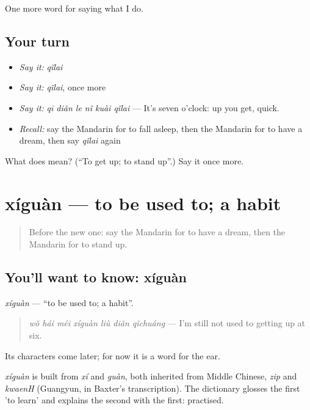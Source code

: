 \begin{grammarlens}[title={What you've built}]
One more word for saying what I do.
\end{grammarlens}

\subsection*{Your turn}
\begin{itemize}
\raggedright
  \item \emph{Say it:} \emph{qǐlai}
  \item \emph{Say it:} \emph{qǐlai}, once more
  \item \emph{Say it:} \emph{qī diǎn le nǐ kuài qǐlai} — It's seven o'clock: up you get, quick.
  \item \emph{Recall:} say the Mandarin for to fall asleep, then the Mandarin for to have a dream, then say \emph{qǐlai} again
\end{itemize}

\begin{tcolorbox}[breakable,colback=teal!4,colframe=teal!35!black,title={Before you move on}]
What does  mean? (\textquotedblleft{}To get up; to stand up\textquotedblright{}.) Say it once more.
\end{tcolorbox}
\section[xíguàn]{xíguàn — to be used to; a habit}

\label{lesson:ZH-C158-xiguan}



\begin{quote}
Before the new one: say the Mandarin for to have a dream, then the Mandarin for to stand up.
\end{quote}

\subsection*{You'll want to know: xíguàn}
\emph{xíguàn} — \textquotedblleft{}to be used to; a habit\textquotedblright{}.

\begin{quote}
\emph{wǒ hái méi xíguàn liù diǎn qǐchuáng} — I'm still not used to getting up at six.
\end{quote}

Its characters come later; for now it is a word for the ear.

\begin{cousinweb}
\emph{xíguàn} is built from \emph{xí} and \emph{guàn}, both inherited from Middle Chinese, \emph{zip} and \emph{kwaenH} (Guangyun, in Baxter's transcription). The dictionary glosses the first 'to learn' and explains the second with the first: practised.
\end{cousinweb}

